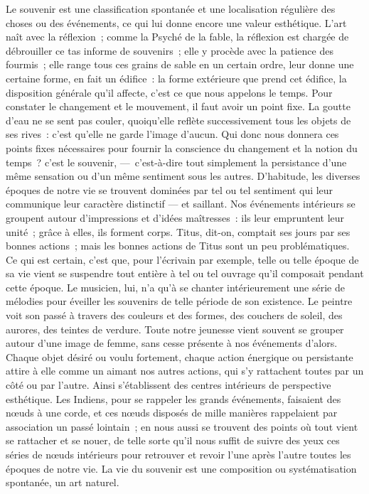 \documentclass[french,twoside]{book} %
\begin{document}
Le souvenir est une classification spontanée et une localisation régulière des choses ou des événements, ce qui lui donne encore une valeur esthétique. L’art naît avec la réflexion ; comme la Psyché de la fable, la réflexion est chargée de débrouiller ce tas informe de souvenirs ; elle y procède avec la patience des fourmis ; elle range tous ces grains de sable en un certain ordre, leur donne une certaine forme, en fait un édifice : la forme extérieure que prend cet édifice, la disposition générale qu’il affecte, c’est ce que nous appelons le temps. Pour constater le changement et le mouvement, il faut avoir un point fixe. La goutte d’eau ne se sent pas couler, quoiqu’elle reflète successivement tous les objets de ses rives : c’est qu’elle ne garde l’image d’aucun. Qui donc nous donnera ces points fixes nécessaires pour fournir la conscience du changement et la notion du temps ? c’est le souvenir, — c’est-à-dire tout simplement la persistance d’une même sensation ou d’un même sentiment sous les autres. D’habitude, les diverses époques de notre vie se trouvent dominées par tel ou tel sentiment qui leur communique leur caractère distinctif — et saillant. Nos événements intérieurs se groupent autour d’impressions et d’idées maîtresses : ils leur empruntent leur unité ; grâce à elles, ils forment corps. Titus, dit-on, comptait ses jours par ses bonnes actions ; mais les bonnes actions de Titus sont un peu problématiques. Ce qui est certain, c’est que, pour l’écrivain par exemple, telle ou telle époque de sa vie vient se suspendre tout entière à tel ou tel ouvrage qu’il composait pendant cette époque. Le musicien, lui, n’a qu’à se chanter intérieurement une série de mélodies pour éveiller les souvenirs de telle période de son existence. Le peintre voit son passé à travers des couleurs et des formes, des couchers de soleil, des aurores, des teintes de verdure. Toute notre jeunesse vient souvent se grouper autour d’une image de femme, sans cesse présente à nos événements d’alors. Chaque objet désiré ou voulu fortement, chaque action énergique ou persistante attire à elle comme un aimant nos autres actions, qui s’y rattachent toutes par un côté ou par l’autre. Ainsi s’établissent des centres intérieurs de perspective esthétique. Les Indiens, pour se rappeler les grands événements, faisaient des nœuds à une corde, et ces nœuds disposés de mille manières rappelaient par association un passé lointain ; en nous aussi se trouvent des points où tout vient se rattacher et se nouer, de telle sorte qu’il nous suffit de suivre des yeux ces séries de nœuds intérieurs pour retrouver et revoir l’une après l’autre toutes les époques de notre vie. La vie du souvenir est une composition ou systématisation spontanée, un art naturel.\par
\end{document}
